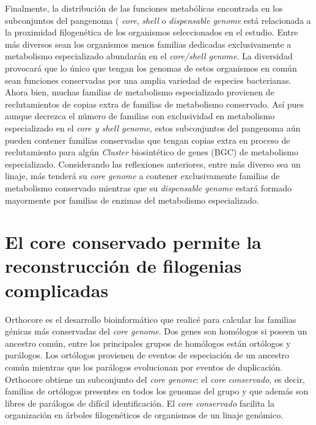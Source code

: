 \documentclass[12pt,twoside]{reedthesis}
\begin{document}
  Finalmente, la distribución de las funciones metabólicas encontrada en
  los subconjuntos del pangenoma ( \emph{core}, \emph{shell} o
  \emph{dispensable genome} está relacionada a la proximidad filogenética
  de los organismos seleccionados en el estudio. Entre más diversos sean
  los organismos menos familias dedicadas exclusivamente a metabolismo
  especializado abundarán en el \emph{core/shell genome}. La diversidad
  provocará que lo único que tengan los genomas de estos organismos en
  común sean funciones conservadas por una amplia variedad de especies
  bacterianas. Ahora bien, muchas familias de metabolismo especializado
  provienen de reclutamientos de copias extra de familias de metabolismo
  conservado. Así pues aunque decrezca el número de familias con
  exclusividad en metabolismo especializado en el \emph{core y shell
  genome}, estos subconjuntos del pangenoma aún pueden contener familias
  conservadas que tengan copias extra en proceso de reclutamiento para
  algún \emph{Cluster} biosintético de genes (BGC) de metabolismo
  especializado. Considerando las reflexiones anteriores, entre más
  diverso sea un linaje, más tenderá su \emph{core genome} a contener
  exclusivamente familias de metabolismo conservado mientras que su
  \emph{dispensable genome} estará formado mayormente por familias de
  enzimas del metabolismo especializado.
  
  \section{El core conservado permite la reconstrucción de filogenias
  complicadas}\label{el-core-conservado-permite-la-reconstruccion-de-filogenias-complicadas}
  
  Orthocore es el desarrollo bioinformático que realicé para calcular las
  familias génicas más conservadas del \emph{core genome}. Dos genes son
  homólogos si poseen un ancestro común, entre los principales grupos de
  homólogos están ortólogos y parálogos. Los ortólogos provienen de
  eventos de especiación de un ancestro común mientras que los parálogos
  evolucionan por eventos de duplicación. Orthocore obtiene un subconjunto
  del \emph{core genome}: el \emph{core conservado}, es decir, familias de
  ortólogos presentes en todos los genomas del grupo y que además son
  libres de parálogos de difícil identificación. El \emph{core conservado}
  facilita la organización en árboles filogenéticos de organismos de un
  linaje genómico.
  
\end{document}
